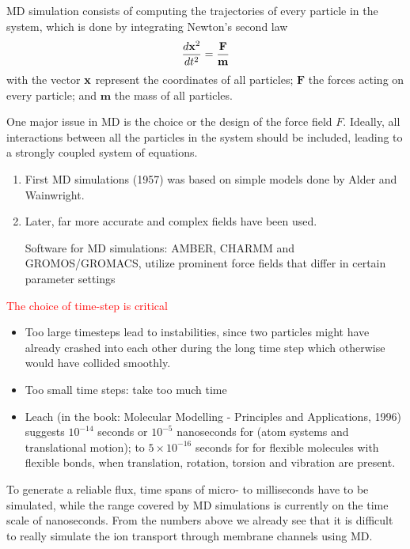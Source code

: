 MD simulation consists of computing the trajectories of every particle in the
system, which is done by integrating Newton's second law
\begin{equation}
\frac{d{\bf x}^2}{dt^2} = \frac{\mathbf{F}}{\mathbf{m}}
\end{equation}
with the vector ${\bf x}$ represent the coordinates of all particles;
$\mathbf{F}$ the forces acting on every particle; and $\mathbf{m}$ the
mass of all particles.

One major issue in MD is the choice or the design of the force field $F$.
Ideally, all interactions between all the particles in the system should be
included, leading to a strongly coupled system of equations.
\begin{enumerate}
  \item First MD simulations (1957) was based on simple models done by Alder and
  Wainwright.

  \item Later, far more accurate and complex fields have been used.

  Software for MD simulations: AMBER, CHARMM and GROMOS/GROMACS, utilize
  prominent force fields that differ in certain parameter settings
\end{enumerate}
\textcolor{red}{The choice of time-step is critical}
\begin{itemize}

  \item  Too large timesteps lead to instabilities, since two particles
might have already crashed into each other during the long time step which
otherwise would have collided smoothly.

 \item Too small time steps: take too much time

 \item Leach (in the book: Molecular Modelling -  Principles and Applications,
 1996) suggests $10^{-14}$ seconds or $10^{-5}$ nanoseconds for (atom systems
 and translational motion); to $5\times 10^{-16}$ seconds for
 for flexible molecules with flexible bonds, when translation, rotation,
 torsion and vibration are present.

\end{itemize}

To generate a reliable flux, time spans of micro- to milliseconds have to be
simulated, while the range covered by MD simulations is currently on the time
scale of nanoseconds. From the numbers above we already see that it is difficult
to really simulate the ion transport through membrane channels using MD.

